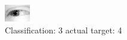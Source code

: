 \begin{figure}[h!]
\begin{center}
\includegraphics[width=0.60\columnwidth]{figures/ID2504_class_3_target_4.png}
\end{center}
\caption{ Classification: 3 actual target: 4}
\label{fig:ID2504_class_3_target_4}
\end{figure}
